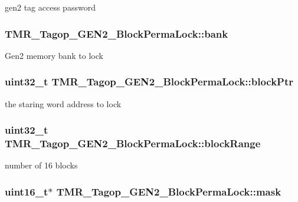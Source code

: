 gen2 tag access password \hypertarget{struct_t_m_r___tagop___g_e_n2___block_perma_lock_294a9e65e0a8ba916041a3a9a1c647b3}{
\subsubsection[{bank}]{ {\bf TMR\_\-Tagop\_\-GEN2\_\-BlockPermaLock::bank}}}
\label{struct_t_m_r___tagop___g_e_n2___block_perma_lock_294a9e65e0a8ba916041a3a9a1c647b3}


Gen2 memory bank to lock \hypertarget{struct_t_m_r___tagop___g_e_n2___block_perma_lock_3c0aa3e5175b38845cff4fa2e332ce45}{
\subsubsection[{blockPtr}]{\setlength{\rightskip}{0pt plus 5cm}uint32\_\-t {\bf TMR\_\-Tagop\_\-GEN2\_\-BlockPermaLock::blockPtr}}}
\label{struct_t_m_r___tagop___g_e_n2___block_perma_lock_3c0aa3e5175b38845cff4fa2e332ce45}


the staring word address to lock \hypertarget{struct_t_m_r___tagop___g_e_n2___block_perma_lock_d70ba97cc189d8945fd037625bfdb3fc}{
\subsubsection[{blockRange}]{\setlength{\rightskip}{0pt plus 5cm}uint32\_\-t {\bf TMR\_\-Tagop\_\-GEN2\_\-BlockPermaLock::blockRange}}}
\label{struct_t_m_r___tagop___g_e_n2___block_perma_lock_d70ba97cc189d8945fd037625bfdb3fc}


number of 16 blocks \hypertarget{struct_t_m_r___tagop___g_e_n2___block_perma_lock_1efb4e5a091e963605b860c187ece0d8}{
\subsubsection[{mask}]{\setlength{\rightskip}{0pt plus 5cm}uint16\_\-t$\ast$ {\bf TMR\_\-Tagop\_\-GEN2\_\-BlockPermaLock::mask}}}
\label{struct_t_m_r___tagop___g_e_n2___block_perma_lock_1efb4e5a091e963605b860c187ece0d8}


